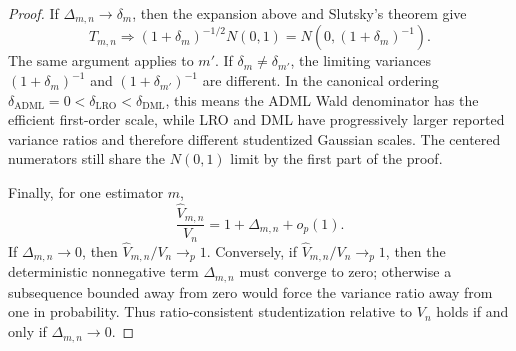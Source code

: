 \documentclass[11pt]{article}
\theoremstyle{definition}
\theoremstyle{plain}
\theoremstyle{remark}
\begin{document}
\begin{proof}
If \(\Delta_{m,n}\to\delta_m\), then the expansion above and Slutsky's theorem
give
\[
  T_{m,n}
  \Rightarrow
  (1+\delta_m)^{-1/2}N(0,1)
  =
  N(0,(1+\delta_m)^{-1}).
\]
The same argument applies to \(m'\).  If \(\delta_m\ne\delta_{m'}\), the
limiting variances \((1+\delta_m)^{-1}\) and \((1+\delta_{m'})^{-1}\) are
different.  In the canonical ordering
\(\delta_{\mathrm{ADML}}=0<\delta_{\mathrm{LRO}}<\delta_{\mathrm{DML}}\), this
means the ADML Wald denominator has the efficient first-order scale, while
LRO and DML have progressively larger reported variance ratios and therefore
different studentized Gaussian scales.  The centered numerators still share
the \(N(0,1)\) limit by the first part of the proof.

Finally, for one estimator \(m\),
\[
  \frac{\hat V_{m,n}}{V_n}
  =
  1+\Delta_{m,n}+o_p(1).
\]
If \(\Delta_{m,n}\to0\), then \(\hat V_{m,n}/V_n\to_p1\).  Conversely, if
\(\hat V_{m,n}/V_n\to_p1\), then the deterministic nonnegative term
\(\Delta_{m,n}\) must converge to zero; otherwise a subsequence bounded away
from zero would force the variance ratio away from one in probability.  Thus
ratio-consistent studentization relative to \(V_n\) holds if and only if
\(\Delta_{m,n}\to0\).
\end{proof}
\end{document}
